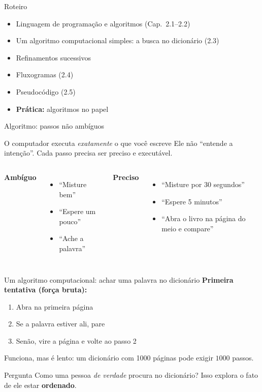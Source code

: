 \documentclass[aspectratio=169,10pt,t]{beamer}
\begin{document}
\capa

\begin{frame}{Roteiro}
  \begin{itemize}
    \item Linguagem de programação e algoritmos (Cap.~2.1--2.2)
    \item Um algoritmo computacional simples: a busca no dicionário (2.3)
    \item Refinamentos sucessivos
    \item Fluxogramas (2.4)
    \item Pseudocódigo (2.5)
    \item \textbf{Prática:} algoritmos no papel
  \end{itemize}
\end{frame}

\begin{frame}{Algoritmo: passos não ambíguos}
  \begin{block}{O computador executa \emph{exatamente} o que você escreve}
    Ele não ``entende a intenção''. Cada passo precisa ser preciso e executável.
  \end{block}
  \begin{columns}[T]
    \textbf{Ambíguo}
    \begin{itemize}
      \item ``Misture bem''
      \item ``Espere um pouco''
      \item ``Ache a palavra''
    \end{itemize}
    \textbf{Preciso}
    \begin{itemize}
      \item ``Misture por 30 segundos''
      \item ``Espere 5 minutos''
      \item ``Abra o livro na página do meio e compare''
    \end{itemize}
  \end{columns}
\end{frame}

\begin{frame}{Um algoritmo computacional: achar uma palavra no dicionário}
  \textbf{Primeira tentativa (força bruta):}
  \begin{enumerate}
    \item Abra na primeira página
    \item Se a palavra estiver ali, pare
    \item Senão, vire a página e volte ao passo 2
  \end{enumerate}
  Funciona, mas é lento: um dicionário com 1000 páginas pode exigir \(1000\) passos.
  \vspace{1ex}
  \begin{alertblock}{Pergunta}
    Como uma pessoa \emph{de verdade} procura no dicionário? Isso explora o fato de ele estar \textbf{ordenado}.
  \end{alertblock}
\end{frame}
\end{document}
